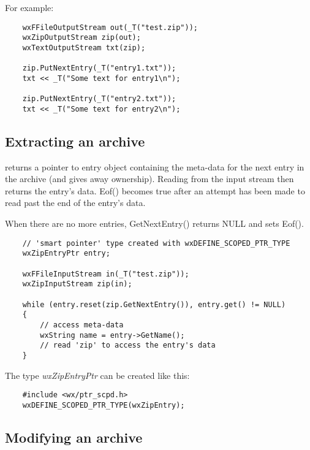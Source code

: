 For example:

\begin{verbatim}
    wxFFileOutputStream out(_T("test.zip"));
    wxZipOutputStream zip(out);
    wxTextOutputStream txt(zip);

    zip.PutNextEntry(_T("entry1.txt"));
    txt << _T("Some text for entry1\n");

    zip.PutNextEntry(_T("entry2.txt"));
    txt << _T("Some text for entry2\n");

\end{verbatim}


\subsection{Extracting an archive}\label{wxarcextract}


 returns a pointer
to entry object containing the meta-data for the next entry in the archive
(and gives away ownership). Reading from the input stream then returns the
entry's data. Eof() becomes true after an attempt has been made to read past
the end of the entry's data.

When there are no more entries, GetNextEntry() returns NULL and sets Eof().

\begin{verbatim}
    // 'smart pointer' type created with wxDEFINE_SCOPED_PTR_TYPE
    wxZipEntryPtr entry;

    wxFFileInputStream in(_T("test.zip"));
    wxZipInputStream zip(in);

    while (entry.reset(zip.GetNextEntry()), entry.get() != NULL)
    {
        // access meta-data
        wxString name = entry->GetName();
        // read 'zip' to access the entry's data
    }

\end{verbatim}

The  type {\em wxZipEntryPtr}
can be created like this:

\begin{verbatim}
    #include <wx/ptr_scpd.h>
    wxDEFINE_SCOPED_PTR_TYPE(wxZipEntry);

\end{verbatim}


\subsection{Modifying an archive}\label{wxarcmodify}

